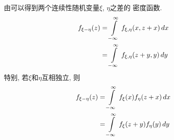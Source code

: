 \begin{subtraction_of_two_random_var}
    由可以得到两个连续性随机变量\(\xi\), \(\eta\)之差的
    密度函数.
    \begin{align}
        f_{\xi - \eta}(z) &= \int\limits_{-\infty}^{\infty}\,f_{\xi, \eta}(x, z+x)\,dx\cr
        &= \int\limits_{-\infty}^{\infty}\,f_{\xi, \eta}(z+y, y)\,dy
    \end{align}
    特别, 若\(\xi\)和\(\eta\)互相独立, 则
    \begin{align}
        f_{\xi - \eta}(z) &= \int\limits_{-\infty}^{\infty}\,f_{\xi}(x)f_{\eta}(z+x)\,dx\cr
        &= \int\limits_{-\infty}^{\infty}\,f_{\xi}(z+y)f_{\eta}(y)\,dy
    \end{align}
\end{subtraction_of_two_random_var}

